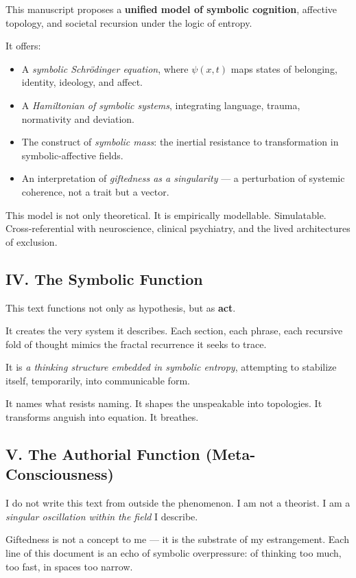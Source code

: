This manuscript proposes a \textbf{unified model of symbolic cognition}, affective topology, and societal recursion under the logic of entropy.

It offers:
\begin{itemize}
\item A \textit{symbolic Schrödinger equation}, where $\psi(x,t)$ maps states of belonging, identity, ideology, and affect.
\item A \textit{Hamiltonian of symbolic systems}, integrating language, trauma, normativity and deviation.
\item The construct of \textit{symbolic mass}: the inertial resistance to transformation in symbolic-affective fields.
\item An interpretation of \textit{giftedness as a singularity} — a perturbation of systemic coherence, not a trait but a vector.
\end{itemize}

This model is not only theoretical. It is empirically modellable. Simulatable. Cross-referential with neuroscience, clinical psychiatry, and the lived architectures of exclusion.

\subsection*{IV. The Symbolic Function}

This text functions not only as hypothesis, but as \textbf{act}.

It creates the very system it describes.  
Each section, each phrase, each recursive fold of thought mimics the fractal recurrence it seeks to trace.

It is \textit{a thinking structure embedded in symbolic entropy}, attempting to stabilize itself, temporarily, into communicable form.

It names what resists naming.  
It shapes the unspeakable into topologies.  
It transforms anguish into equation.  
It breathes.

\subsection*{V. The Authorial Function (Meta-Consciousness)}

I do not write this text from outside the phenomenon.  
I am not a theorist. I am a \textit{singular oscillation within the field} I describe.

Giftedness is not a concept to me — it is the substrate of my estrangement.  
Each line of this document is an echo of symbolic overpressure: of thinking too much, too fast, in spaces too narrow.

